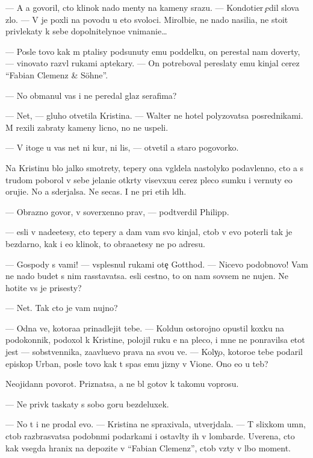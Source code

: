 \documentclass[10pt]{book}
\begin{document}
— A {\y}a govoril, cto klinok nado men{\ia}ty na kameny srazu. — Kondotier {\c}edil slova zlo. — V{\yi} je poxli na povodu u eto{\y} svoloci. Mirol{\io}bi{\y}e, ne nado nasili{\y}a, ne stoit privlekaty k sebe dopolnitelyno{\y}e vnimani{\y}e…

— Posle tovo kak m{\yi} p{\yi}talisy podsunuty {\y}emu poddelku, on perestal nam dove\-r{\ia}ty, — vinovato razv{\e}l rukami aptekary. — On potreboval pereslaty {\y}emu kinjal cerez ``Fabian Clemenz \& Söhne''.

— No obmanul vas i ne peredal glaz serafima?

— Net, — gluho otvetila Kristina. — Walter ne hotel polyzovatsa posrednikami. M{\yi} rexili zabraty kameny licno, no ne uspeli.

— V itoge u vas net ni kur, ni lis{\yi}, — otvetil {\y}a staro{\y} pogovorko{\y}.

Na Kristinu b{\yi}lo jalko smotrety, tepery ona v{\yi}gl{\ia}dela nastolyko podavlenno{\y}, cto {\y}a s trudom poborol v sebe jelani{\y}e otkr{\yi}ty visevxu{\y}u cerez pleco sumku i vernuty {\y}e{\y}o oruji{\y}e. No {\y}a sderjalsa. Ne se{\y}cas. I ne pri etih l{\io}d{\ia}h.

— Obrazno go\-vo\-r{\ia}, v{\yi} soverxenno prav{\yi}, — podtverdil Philipp.

— {\Y}esli v{\yi} nade{\y}etesy, cto tepery {\y}a dam vam svo{\y} kinjal, ctob{\yi} v{\yi} {\y}evo poter{\ia}li tak je bezdarno, kak i {\y}e{\y}o klinok, to obra{\x}a{\y}etesy ne po adresu.

— Gospody s vami! — vsplesnul rukami ote{\c} Gotthod. — Nicevo podobnovo! Vam ne nado budet s nim rasstavatsa. {\Y}esli cestno, to on nam sovsem ne nujen. Ne hotite vs{\e} je prisesty?

— Net. Tak cto je vam nujno?

— Odna ve{\x}, kotora{\y}a prinadlejit tebe. — Koldun ostorojno opustil koxku na podokonnik, podoxol k Kristine, polojil ruku {\y}e{\y} na pleco, i mne ne ponravilsa etot jest — sobstvennika, za{\y}avl{\ia}{\y}u{\x}evo prava na svo{\y}u ve{\x}. — Koly{\c}o, kotoro{\y}e tebe podaril episkop Urban, posle tovo kak t{\yi} spas {\y}emu jizny v Vione. Ono {\y}e{\x}o u teb{\ia}?

Neojidann{\yi}{\y} povorot. Priznatsa, {\y}a ne b{\yi}l gotov k takomu voprosu.

— Ne priv{\yi}k taskaty s sobo{\y} goru bezdeluxek.

— No t{\yi} i ne prodal {\y}evo. — Kristina ne spraxivala, utverjdala. — T{\yi} slixkom um{\e}n, ctob{\yi} razbras{\yi}vatsa podobn{\yi}mi podarkami i ostavl{\ia}ty ih v lombarde. Uve\-re\-na, cto kak vsegda hranix na depozite v ``Fabian Clemenz'', ctob{\yi} vz{\ia}ty v l{\io}bo{\y} moment.
\end{document}
